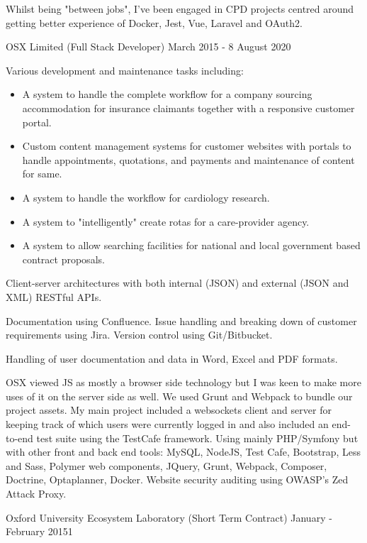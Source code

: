 Whilst being "between jobs", I've been engaged in CPD projects centred around
getting better experience of Docker, Jest, Vue, Laravel and OAuth2.

\jobHeading
    {OSX Limited (Full Stack Developer)}
    {March 2015 - 8 August 2020}

Various development and maintenance tasks including:
\begin{itemize}
    \item A system to handle the complete workflow for a company sourcing accommodation for insurance claimants together with a responsive customer portal.
    \item Custom content management systems for customer websites with portals to handle appointments, quotations, and payments and maintenance of content for same.
    \item A system to handle the workflow for cardiology research.
    \item A system to "intelligently" create rotas for a care-provider agency.
    \item A system to allow searching facilities for national and local government based contract proposals.
\end{itemize}

Client-server architectures with both
internal (JSON) and external (JSON and XML) RESTful APIs.

Documentation using Confluence. Issue handling and breaking down
of customer requirements using Jira. Version control using Git/Bitbucket.

Handling of user documentation and data in Word, Excel and PDF formats.


\ifnum{}
    OSX viewed JS as mostly a browser side technology
    but I was keen to make more uses of it on the server side as well.
    We used Grunt and Webpack to bundle our project assets.
    My main project included a websockets client and server
    for keeping track of which users were currently logged in
    and also included an end-to-end test suite
    using the TestCafe framework.
\else
    Using mainly PHP/Symfony but with other front and back end tools:
    MySQL, NodeJS, Test Cafe, Bootstrap, Less and Sass,
    Polymer web components, JQuery, Grunt, Webpack, Composer,
    Doctrine, Optaplanner, Docker.
    Website security auditing using OWASP's Zed Attack Proxy.
\fi

\jobHeading
    {Oxford University Ecosystem Laboratory (Short Term Contract)}
    {January - February 20151}

